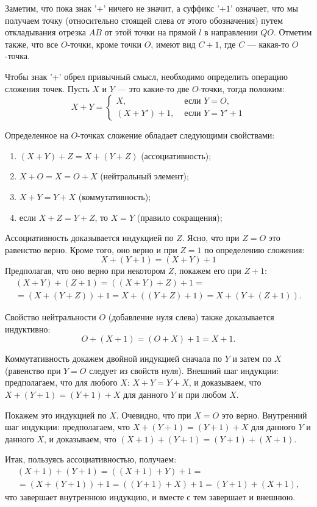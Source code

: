 Заметим, что пока знак '+' ничего не значит, а суффикс '$+1$' означает, что мы получаем точку (относительно стоящей слева от этого обозначения) путем откладывания отрезка $AB$ от этой точки на прямой $l$ в направлении $QO$. Отметим также, что все $O$-точки, кроме точки $O$, имеют вид $C+1$, где $C$ --- какая-то $O$-точка.

Чтобы знак '+' обрел привычный смысл, необходимо определить операцию сложения точек. Пусть $X$ и $Y$ --- это какие-то две $O$-точки, тогда положим:
$$
X+Y = 
\begin{cases}
X, & \mbox{ если }Y=O,\\
(X+Y')+1, & \mbox{ если }Y=Y'+1
\end{cases}
$$

Определенное на $O$-точках сложение обладает следующими свойствами:
\begin{enumerate}[S1]
\item $(X+Y)+Z=X+(Y+Z)$ (ассоциативность);
\item $X+O=X=O+X$ (нейтральный элемент);
\item $X+Y=Y+X$ (коммутативность);
\item если $X+Z=Y+Z$, то $X=Y$ (правило сокращения);
\end{enumerate}

Ассоциативность доказывается индукцией по $Z$. Ясно, что при $Z=O$ это равенство верно. Кроме того, оно верно и при $Z=1$ по определению сложения:
$$
X+(Y+1)=(X+Y)+1
$$
Предполагая, что оно верно при некотором $Z$, покажем его при $Z+1$:
\begin{multline*}
(X+Y)+(Z+1)=((X+Y)+Z)+1=\\
=(X+(Y+Z))+1=X+((Y+Z)+1)=X+(Y+(Z+1)).
\end{multline*}

Свойство нейтральности $O$ (добавление нуля слева) также доказывается индуктивно:
$$
O+(X+1)=(O+X)+1=X+1.
$$

Коммутативность докажем двойной индукцией сначала по $Y$ и затем по $X$ (равенство при $Y=O$ следует из свойств нуля).
Внешний шаг индукции: предполагаем, что для любого $X$: $X+Y=Y+X$, и доказываем, что $X+(Y+1)=(Y+1)+X$ для данного $Y$ и при любом $X$.

Покажем это индукцией по $X$. Очевидно, что при $X=O$ это верно. Внутренний шаг индукции: предполагаем, что $X+(Y+1)=(Y+1)+X$ для данного $Y$ и данного $X$, и доказываем, что $(X+1)+(Y+1)=(Y+1)+(X+1)$.

Итак, пользуясь ассоциативностью, получаем:
\begin{multline*}
(X+1)+(Y+1)=((X+1)+Y)+1=\\
=(X+(Y+1))+1=((Y+1)+X)+1=(Y+1)+(X+1),
\end{multline*}
что завершает внутреннюю индукцию, и вместе с тем завершает и внешнюю.

